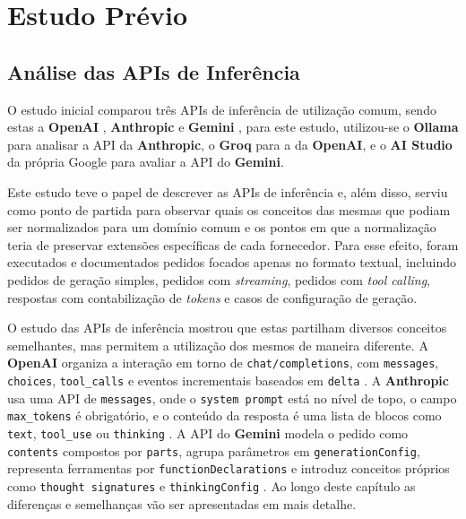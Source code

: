 ﻿    \chapter{Estudo Prévio}
\section{Análise das APIs de Inferência}

O estudo inicial comparou três APIs de inferência de utilização comum, sendo estas a \textbf{OpenAI} \cite{openai_api}, \textbf{Anthropic} \cite{anthropic_api} e \textbf{Gemini} \cite{google_gemini_api}, para este estudo, utilizou-se o \textbf{Ollama} \cite{ollama_docs} para analisar a API da \textbf{Anthropic}, o \textbf{Groq} para a da \textbf{OpenAI}, e o \textbf{AI Studio}\cite{google_aistudio} da própria Google para avaliar a API do \textbf{Gemini}. 


Este estudo teve o papel de descrever as APIs de inferência e, além disso, serviu como ponto de partida para observar quais os conceitos das mesmas que podiam ser normalizados para um domínio comum e os pontos em que a normalização teria de preservar extensões específicas de cada fornecedor. Para esse efeito, foram executados e documentados pedidos focados apenas no formato textual, incluindo pedidos de geração simples, pedidos com \textit{streaming}, pedidos com \textit{tool calling}, respostas com contabilização de \textit{tokens} e casos de configuração de geração.

O estudo das APIs de inferência mostrou que estas partilham diversos conceitos semelhantes, mas permitem a utilização dos mesmos de maneira diferente. A \textbf{OpenAI} organiza a interação em torno de \texttt{chat/completions}, com \texttt{messages}, \texttt{choices}, \texttt{tool\_calls} e eventos incrementais baseados em \texttt{delta} \cite{openai_api}. A \textbf{Anthropic} usa uma API de \texttt{messages}, onde o \texttt{system prompt} está no nível de topo, o campo \texttt{max\_tokens} é obrigatório, e o conteúdo da resposta é uma lista de blocos como \texttt{text}, \texttt{tool\_use} ou \texttt{thinking} \cite{anthropic_api}. A API do \textbf{Gemini} modela o pedido como \texttt{contents} compostos por \texttt{parts}, agrupa parâmetros em \texttt{generationConfig}, representa ferramentas por \texttt{functionDeclarations} e introduz conceitos próprios como \texttt{thought signatures} e \texttt{thinkingConfig} \cite{google_gemini_api}. Ao longo deste capítulo as diferenças e semelhanças vão ser apresentadas em mais detalhe.

